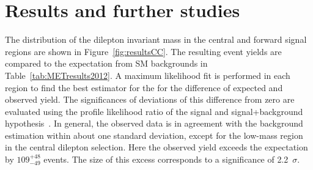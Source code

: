 \section{Results and further studies}
\label{sec:candcresults}
The distribution of the dilepton invariant mass in the central and forward signal regions are shown in Figure~\ref{fig:resultsCC}. The resulting event yields are compared to the expectation from SM backgrounds in Table~\ref{tab:METresults2012}. A maximum likelihood fit is performed in each region to find the best estimator for the for the difference of expected and observed yield. The significances of deviations of this difference from zero are evaluated using the profile likelihood ratio of the signal and signal+background hypothesis~\cite{HiggsTool1}. In general, the observed data is in agreement with the background estimation within about one standard deviation, except for the low-mass region in the central dilepton selection. Here the observed yield exceeds the expectation by $109^{+48}_{-49}$ events. The size of this excess corresponds to a significance of 2.2~$\sigma$.  
